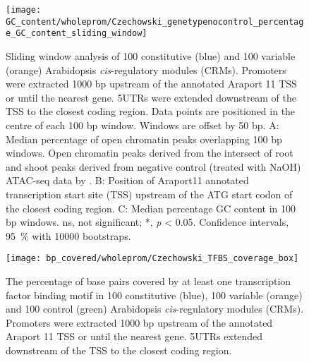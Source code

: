 \documentclass[../Sam_Witham_Thesis.tex]{subfiles}
\begin{document}
\begin{figure}[!h]
	\begin{center}
		\capstart
		\texttt{[image: GC\_content/wholeprom/Czechowski\_genetypenocontrol\_percentage\_GC\_content\_sliding\_window]}
		\caption{
			Sliding window analysis of 100 constitutive (blue) and 100 variable (orange) Arabidopsis \textit{cis}\hyp{}regulatory modules (CRMs). Promoters were extracted 1000 bp upstream of the annotated Araport 11 \autocite{chengAraport11CompleteReannotation2017} TSS or until the nearest gene.
			5UTRs were extended downstream of the TSS to the closest coding region.
			Data points are positioned in the centre of each 100 bp window.
			Windows are offset by 50 bp.
			A: Median percentage of open chromatin peaks overlapping 100 bp windows. Open chromatin peaks derived from the intersect of root and shoot peaks derived from negative control (treated with NaOH) ATAC\hyp{}seq data by \textcite{potterCytokininModulatesContextdependent2018}.
			B: Position of Araport11 annotated transcription start site (TSS) upstream of the ATG start codon of the closest coding region.			
			C: Median percentage GC content in 100 bp windows.			
			ns, not significant; *, \textit{p} \textless{} 0.05. Confidence intervals, \SI{95}{\percent} with 10000 bootstraps.
			\label{fig:gc-content-sliding-window}
		}
	\end{center}
\end{figure}








\begin{figure}[!h]
	\begin{center}
		\capstart
		\texttt{[image: bp\_covered/wholeprom/Czechowski\_TFBS\_coverage\_box]}
		\caption{
			The percentage of base pairs covered by at least one transcription
			factor binding motif in 100 constitutive (blue), 100 variable (orange) and 100 control (green)
			Arabidopsis \textit{cis}\hyp{}regulatory modules (CRMs). Promoters were extracted 1000 bp upstream of the
			annotated Araport 11 \autocite{chengAraport11CompleteReannotation2017} TSS or until the nearest gene. 5UTRs extended downstream of the TSS to the closest coding region.
			\label{fig:bp-covered-wholeprom}
		}
	\end{center}
\end{figure}
\end{document}
